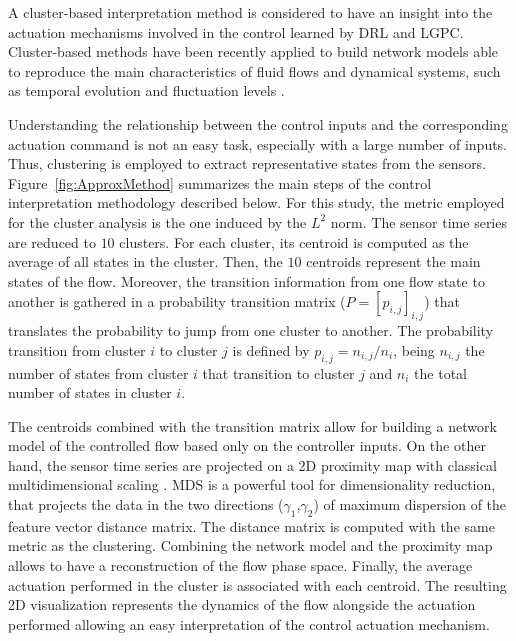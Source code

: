 A cluster-based interpretation method is considered to have an insight into the actuation mechanisms involved in the control learned by DRL and LGPC. Cluster-based methods have been recently applied to build network models able to reproduce the main characteristics of fluid flows and dynamical systems, such as temporal evolution and fluctuation levels \citep{Fernex2021,LiH2021jfm}.

Understanding the relationship between the control inputs and the corresponding actuation command is not an easy task, especially with a large number of inputs. Thus, clustering is employed to extract representative states from the sensors. Figure~\ref{fig:ApproxMethod} summarizes the main steps of the control interpretation methodology described below. For this study, the metric employed for the cluster analysis is the one induced by the $L^2$ norm. The sensor time series are reduced to $10$ clusters. For each cluster, its centroid is computed as the average of all states in the cluster. Then, the $10$ centroids represent the main states of the flow. Moreover, the transition information from one flow state to another is gathered in a probability transition matrix ($P=[p_{i,j}]_{i,j}$) that translates the probability to jump from one cluster to another. The probability transition from cluster $i$ to cluster $j$ is defined by $p_{i,j}={n_{i,j}}/{n_i}$, being $n_{i,j}$ the number of states from cluster $i$ that transition to cluster $j$ and $n_i$ the total number of states in cluster $i$.

The centroids combined with the transition matrix allow for building a network model of the controlled flow based only on the controller inputs. On the other hand, the sensor time series are projected on a 2D proximity map with classical multidimensional scaling \citep[MDS]{Kaiser2017ifac,LiA2022jfm,foroozan2021unsupervised}. MDS is a powerful tool for dimensionality reduction, that projects the data in the two directions ($\gamma_1$,$\gamma_2$) of maximum dispersion of the feature vector distance matrix. The distance matrix is computed with the same metric as the clustering. Combining the network model and the proximity map allows to have a reconstruction of the flow phase space. Finally, the average actuation performed in the cluster is associated with each centroid. The resulting 2D visualization represents the dynamics of the flow alongside the actuation performed allowing an easy interpretation of the control actuation mechanism.


